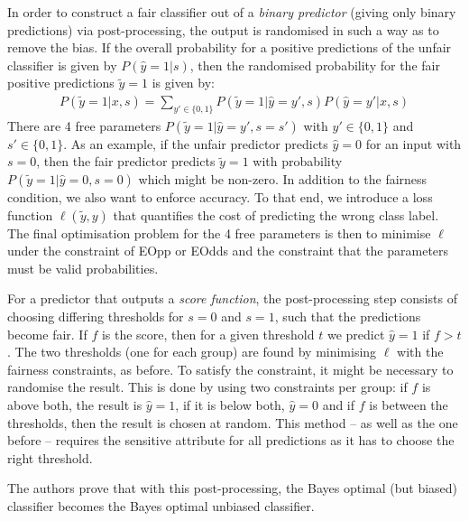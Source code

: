 In order to construct a fair classifier out of a \emph{binary predictor}
(giving only binary predictions) via post-processing,
the output is randomised in such a way as to remove the bias.
If the overall probability for a positive predictions of the unfair classifier is given by \(P(\hat{y}=1|s)\),
then the randomised probability for the fair positive predictions \(\tilde{y} = 1\) is given by:
\begin{align}
  \label{eq:hardt}
  P(\tilde{y}=1| x, s) = \sum\limits_{y' \in \{0, 1\}} P(\tilde{y} = 1| \hat{y}=y', s) 
  P(\hat{y}=y'| x, s)
\end{align}
There are 4 free parameters \(P(\tilde{y} = 1| \hat{y}=y', s=s')\) with \(y' \in \{0, 1\}\) and \(s' \in \{0, 1\}\).
As an example, if the unfair predictor predicts \(\hat{y} =0\) for an input with \(s=0\),
then the fair predictor predicts \(\tilde{y} =1\) with probability \(P(\tilde{y} = 1| \hat{y}=0, s=0)\)
which might be non-zero.
In addition to the fairness condition, we also want to enforce accuracy.
To that end, we introduce a loss function \(\ell (\tilde{y}, y)\)
that quantifies the cost of predicting the wrong class label.
The final optimisation problem for the 4 free parameters is then to minimise \(\ell\)
under the constraint of \ac{EOpp} or \ac{EOdds}
and the constraint that the parameters must be valid probabilities.

For a predictor that outputs a \emph{score function},
the post-processing step consists of choosing differing thresholds for \(s=0\) and \(s=1\),
such that the predictions become fair.
If \(f\) is the score, then for a given threshold \(t\) we predict \(\hat{y} = 1\) if \(f > t\).
The two thresholds (one for each group) are found by minimising \(\ell\) with the fairness constraints, as before.
To satisfy the constraint, it might be necessary to randomise the result.
This is done by using two constraints per group:
if \(f\) is above both, the result is \(\hat{y} = 1\), if it is below both, \(\hat{y} =0\)
and if \(f\) is between the thresholds, then the result is chosen at random.
This method -- as well as the one before --
requires the sensitive attribute for all predictions as it has to choose the right threshold.

The authors prove that with this post-processing,
the Bayes optimal (but biased) classifier becomes the Bayes optimal unbiased classifier.


